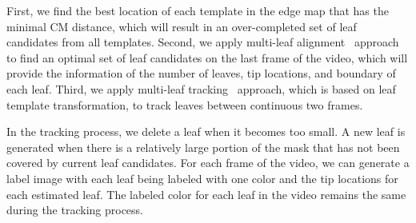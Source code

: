 First, we find the best location of each template in the edge map that has the minimal CM distance, which will result in an over-completed set of leaf candidates from all templates.
Second, we apply multi-leaf alignment~\cite{yin2014a} approach to find an optimal set of leaf candidates on the last frame of the video, which will provide the information of the number of leaves, tip locations, and boundary of each leaf.
Third, we apply multi-leaf tracking~\cite{yin2014b} approach, which is based on leaf template transformation, to track leaves between continuous two frames.

In the tracking process, we delete a leaf when it becomes too small.
A new leaf is generated when there is a relatively large portion of the mask that has not been covered by current leaf candidates.
For each frame of the video, we can generate a label image with each leaf being labeled with one color and the tip locations for each estimated leaf.
The labeled color for each leaf in the video remains the same during the tracking process.


